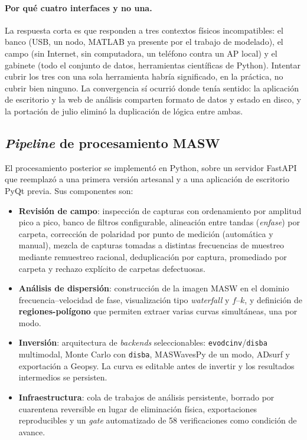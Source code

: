 \paragraph{Por qu\'e cuatro interfaces y no una.} La respuesta corta es que responden a
tres contextos f\'isicos incompatibles: el banco (USB, un nodo, MATLAB ya presente por el
trabajo de modelado), el campo (sin Internet, sin computadora, un tel\'efono contra un AP
local) y el gabinete (todo el conjunto de datos, herramientas cient\'ificas de Python).
Intentar cubrir los tres con una sola herramienta habr\'ia significado, en la pr\'actica,
no cubrir bien ninguno. La convergencia s\'i ocurri\'o donde ten\'ia sentido: la
aplicaci\'on de escritorio y la web de an\'alisis comparten formato de datos y estado en
disco, y la portaci\'on de julio elimin\'o la duplicaci\'on de l\'ogica entre ambas.

\subsection{\emph{Pipeline} de procesamiento MASW}
\label{sec:arq-pipeline}

El procesamiento posterior se implement\'o en Python, sobre un servidor FastAPI que
reemplaz\'o a una primera versi\'on artesanal y a una aplicaci\'on de escritorio PyQt previa.
Sus componentes son:

\begin{itemize}[itemsep=0.2em]
    \item \textbf{Revisi\'on de campo}: inspecci\'on de capturas con ordenamiento por
    amplitud pico a pico, banco de filtros configurable, alineaci\'on entre tandas
    (\emph{enfase}) por carpeta, correcci\'on de polaridad por punto de medici\'on
    (autom\'atica y manual), mezcla de capturas tomadas a distintas frecuencias de
    muestreo mediante remuestreo racional, deduplicaci\'on por captura, promediado por
    carpeta y rechazo expl\'icito de carpetas defectuosas.
    \item \textbf{An\'alisis de dispersi\'on}: construcci\'on de la imagen MASW en el dominio
    frecuencia--velocidad de fase, visualizaci\'on tipo \emph{waterfall} y $f$--$k$, y
    definici\'on de \textbf{regiones-pol\'igono} que permiten extraer varias curvas
    simult\'aneas, una por modo.
    \item \textbf{Inversi\'on}: arquitectura de \emph{backends} seleccionables:
    \texttt{evodcinv}/\texttt{disba} multimodal, Monte Carlo con \texttt{disba},
    MASWavesPy de un modo, ADsurf y exportaci\'on a Geopsy. La curva es editable antes de
    invertir y los resultados intermedios se persisten.
    \item \textbf{Infraestructura}: cola de trabajos de an\'alisis persistente, borrado
    por cuarentena reversible en lugar de eliminaci\'on f\'isica, exportaciones
    reproducibles y un \emph{gate} automatizado de 58 verificaciones como condici\'on de
    avance.
\end{itemize}

